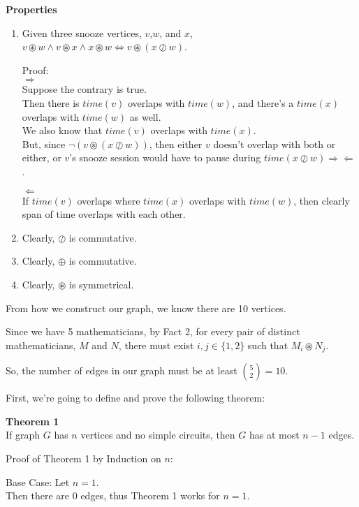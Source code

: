 \documentclass[fleqn]{article}
\begin{document}
\textbf{Properties}
\begin{enumerate}
  \item Given three snooze vertices, $v$,$w$, and $x$,\\
        $v \circledast w \wedge 
         v \circledast x \wedge 
         x \circledast w \Leftrightarrow 
         v \circledast (x \oslash w)$.

        Proof:\\
        $\Rightarrow$\\
        Suppose the contrary is true.\\
        Then there is $time(v)$ overlaps with $time(w)$,
        and there's a $time(x)$ overlaps with $time(w)$ as well.\\
        We also know that $time(v)$ overlaps with $time(x)$.\\
        But, since $\neg(v \circledast (x \oslash w))$, then either
        $v$ doesn't overlap with both or either, or 
        $v$'s snooze session would have to pause during
        $time(x \oslash w) \Rightarrow \Leftarrow$.

         $\Leftarrow$\\
         If $time(v)$ overlaps where $time(x)$ overlaps with $time(w)$,
         then clearly span of time overlaps with each  other.
  \item Clearly, $\oslash$ is commutative.
  \item Clearly, $\oplus$ is commutative.
  \item Clearly, $\circledast$ is symmetrical.
\end{enumerate}

From how we construct our graph, we know there are 10 vertices.

Since we have 5 mathematicians, by Fact 2, for every pair of distinct mathematicians, $M$ and $N$, there must exist $i,j \in \lbrace 1,2 \rbrace$ such that $M_i \circledast N_j$.

So, the number of edges in our graph must be at least ${5 \choose 2} = 10$.

First, we're going to define and prove the following theorem:

\textbf{Theorem 1}\\
If graph $G$ has $n$ vertices and no simple circuits,
then $G$ has at most $n-1$ edges.

Proof of Theorem 1 by Induction on $n$:

Base Case: Let $n = 1$.\\
Then there are 0 edges, thus Theorem 1 works for $n=1$.
\end{document}
